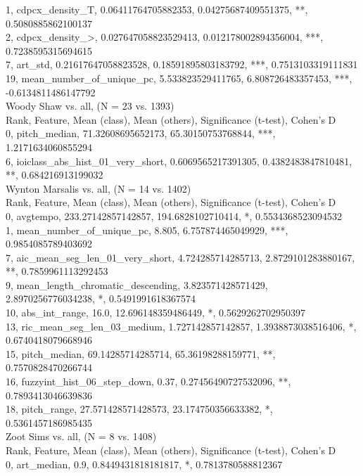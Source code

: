 1, cdpcx_density_T, 0.06411764705882353, 0.04275687409551375, **, 0.5080885862100137\\
2, cdpcx_density_>, 0.027647058823529413, 0.012178002894356004, ***, 0.7238595315694615\\
7, art_std, 0.21617647058823528, 0.18591895803183792, ***, 0.7513103319111831\\
19, mean_number_of_unique_pc, 5.533823529411765, 6.808726483357453, ***, -0.6134811486147792\\
Woody Shaw vs. all, (N = 23 vs. 1393)\\
Rank, Feature, Mean (class), Mean (others), Significance (t-test), Cohen's D\\
0, pitch_median, 71.32608695652173, 65.30150753768844, ***, 1.2171634060855294\\
6, ioiclass_abs_hist_01_very_short, 0.6069565217391305, 0.4382483847810481, **, 0.684216913199032\\
Wynton Marsalis vs. all, (N = 14 vs. 1402)\\
Rank, Feature, Mean (class), Mean (others), Significance (t-test), Cohen's D\\
0, avgtempo, 233.27142857142857, 194.6828102710414, *, 0.5534368523094532\\
1, mean_number_of_unique_pc, 8.805, 6.757874465049929, ***, 0.9854085789403692\\
7, aic_mean_seg_len_01_very_short, 4.724285714285713, 2.8729101283880167, **, 0.7859961113292453\\
9, mean_length_chromatic_descending, 3.823571428571429, 2.8970256776034238, *, 0.5491991618367574\\
10, abs_int_range, 16.0, 12.696148359486449, *, 0.5629262702950397\\
13, ric_mean_seg_len_03_medium, 1.727142857142857, 1.3938873038516406, *, 0.6740418079668946\\
15, pitch_median, 69.14285714285714, 65.36198288159771, **, 0.7570828470266744\\
16, fuzzyint_hist_06_step_down, 0.37, 0.27456490727532096, **, 0.7893413046639836\\
18, pitch_range, 27.571428571428573, 23.174750356633382, *, 0.5361457186985435\\
Zoot Sims vs. all, (N = 8 vs. 1408)\\
Rank, Feature, Mean (class), Mean (others), Significance (t-test), Cohen's D\\
0, art_median, 0.9, 0.8449431818181817, *, 0.7813780588812367\\
